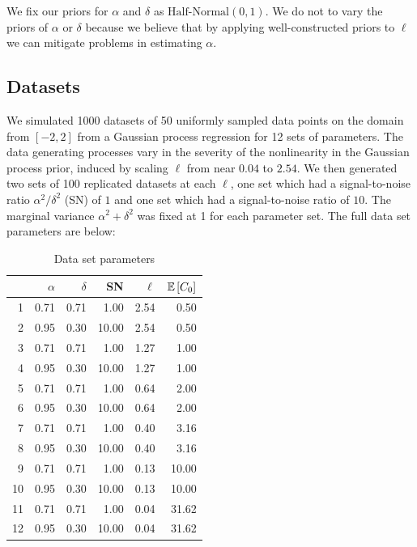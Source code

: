 \documentclass{article}
\newcommand{\Exp}[1]{\ensuremath{\mathbb{E} \lb #1 \rb}}
\newcommand{\lb}{\ensuremath{\left[}}
\newcommand{\rb}{\ensuremath{\right]}}
\begin{document}
We fix our priors for $\alpha$ and $\delta$ as $\text{Half-Normal}(0, 1)$. We
do not to vary the priors of $\alpha$ or $\delta$ because we believe that by
applying well-constructed priors to $\ell$ we can mitigate problems in
estimating $\alpha$. 

\subsection{Datasets}


We simulated 1000 datasets of 50 uniformly sampled data points on the domain
from $[-2, 2]$ from a Gaussian process regression for 12 sets of parameters.
The data generating processes vary in the severity of the nonlinearity in the
Gaussian process prior, induced by scaling $\ell$ from near $0.04$ to $2.54$.
We then generated two sets of 100 replicated datasets at each $\ell$, one set
which had a signal-to-noise ratio $\alpha ^ 2/ \delta ^ 2$ (SN) of $1$ and one
set which had a signal-to-noise ratio of $10$. The marginal variance $\alpha ^
2 + \delta ^ 2$ was fixed at 1 for each parameter set. The full data set
parameters are below:
\begin{table}[ht]
\centering
\caption{Data set parameters}
\begin{tabular}{rrrrrr}
  \hline
  & $\alpha$ & $\delta$ & SN & $\ell$ & $\Exp{C_0}$ \\ 
  \hline
1 & 0.71 & 0.71 & 1.00 & 2.54 & 0.50 \\ 
  2 & 0.95 & 0.30 & 10.00 & 2.54 & 0.50 \\ 
  3 & 0.71 & 0.71 & 1.00 & 1.27 & 1.00 \\ 
  4 & 0.95 & 0.30 & 10.00 & 1.27 & 1.00 \\ 
  5 & 0.71 & 0.71 & 1.00 & 0.64 & 2.00 \\ 
  6 & 0.95 & 0.30 & 10.00 & 0.64 & 2.00 \\ 
  7 & 0.71 & 0.71 & 1.00 & 0.40 & 3.16 \\ 
  8 & 0.95 & 0.30 & 10.00 & 0.40 & 3.16 \\ 
  9 & 0.71 & 0.71 & 1.00 & 0.13 & 10.00 \\ 
  10 & 0.95 & 0.30 & 10.00 & 0.13 & 10.00 \\ 
  11 & 0.71 & 0.71 & 1.00 & 0.04 & 31.62 \\ 
  12 & 0.95 & 0.30 & 10.00 & 0.04 & 31.62 \\ 
   \hline
\end{tabular}
\end{table}
\end{document}
